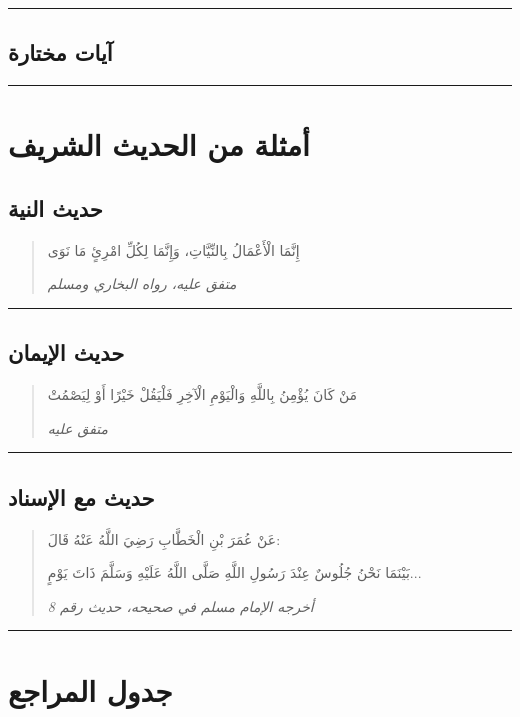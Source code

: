\documentclass[12pt,a4paper]{article}
\newcommand{\quranverse}[2]{%
  \begin{quote}
    {\quranfont\setRTL\quranayah[#1][#2]}%
  \end{quote}
}
\newcommand{\hadith}[2]{%
  \begin{quote}
    \textarabic{\large #1}\par
    \vspace{0.3em}
    \hfill\textit{\small #2}
  \end{quote}
}
\newcommand{\hadithfull}[3]{%
  \begin{quote}
    \textarabic{\large #1}\par
    \vspace{0.2em}
    \textarabic{\large #2}\par
    \vspace{0.3em}
    \hfill\textit{\small #3}
  \end{quote}
}
\newcommand{\separator}{%
  \begin{center}
    \rule{0.3\textwidth}{0.5pt}
  \end{center}
}
\begin{document}
\separator

\subsection{آيات مختارة}

\quranverse{1}{1}

\quranverse{36}{1}

\quranverse{55}{1}

\separator

\section{أمثلة من الحديث الشريف}

\subsection{حديث النية}

\hadith{إِنَّمَا الْأَعْمَالُ بِالنِّيَّاتِ، وَإِنَّمَا لِكُلِّ امْرِئٍ مَا نَوَى}{متفق عليه، رواه البخاري ومسلم}

\separator

\subsection{حديث الإيمان}

\hadith{مَنْ كَانَ يُؤْمِنُ بِاللَّهِ وَالْيَوْمِ الْآخِرِ فَلْيَقُلْ خَيْرًا أَوْ لِيَصْمُتْ}{متفق عليه}

\separator

\subsection{حديث مع الإسناد}

\hadithfull{%
  عَنْ عُمَرَ بْنِ الْخَطَّابِ رَضِيَ اللَّهُ عَنْهُ قَالَ:%
}{%
  بَيْنَمَا نَحْنُ جُلُوسٌ عِنْدَ رَسُولِ اللَّهِ صَلَّى اللَّهُ عَلَيْهِ وَسَلَّمَ ذَاتَ يَوْمٍ...%
}{%
  أخرجه الإمام مسلم في صحيحه، حديث رقم 8%
}

\separator

\section{جدول المراجع}
\end{document}
